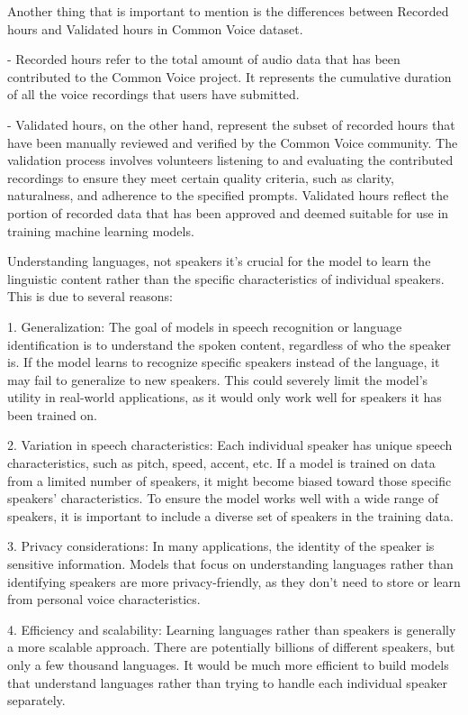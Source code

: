 \documentclass[a4paper]{article}
\begin{document}
Another thing that is important to mention is the differences between Recorded hours and Validated hours in Common Voice dataset.

- Recorded hours refer to the total amount of audio data that has been contributed to the Common Voice project. It represents the cumulative duration of all the voice recordings that users have submitted.

- Validated hours, on the other hand, represent the subset of recorded hours that have been manually reviewed and verified by the Common Voice community. The validation process involves volunteers listening to and evaluating the contributed recordings to ensure they meet certain quality criteria, such as clarity, naturalness, and adherence to the specified prompts. Validated hours reflect the portion of recorded data that has been approved and deemed suitable for use in training machine learning models.

Understanding languages, not speakers it's crucial for the model to learn the linguistic content rather than the specific characteristics of individual speakers. This is due to several reasons:

1. Generalization: The goal of models in speech recognition or language identification is to understand the spoken content, regardless of who the speaker is. If the model learns to recognize specific speakers instead of the language, it may fail to generalize to new speakers. This could severely limit the model's utility in real-world applications, as it would only work well for speakers it has been trained on.

2. Variation in speech characteristics: Each individual speaker has unique speech characteristics, such as pitch, speed, accent, etc. If a model is trained on data from a limited number of speakers, it might become biased toward those specific speakers' characteristics. To ensure the model works well with a wide range of speakers, it is important to include a diverse set of speakers in the training data.

3. Privacy considerations: In many applications, the identity of the speaker is sensitive information. Models that focus on understanding languages rather than identifying speakers are more privacy-friendly, as they don't need to store or learn from personal voice characteristics.

4. Efficiency and scalability: Learning languages rather than speakers is generally a more scalable approach. There are potentially billions of different speakers, but only a few thousand languages. It would be much more efficient to build models that understand languages rather than trying to handle each individual speaker separately.
\end{document}
